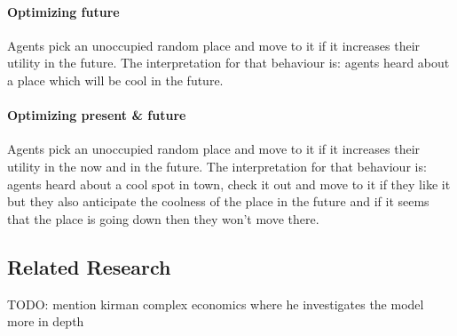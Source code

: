 \paragraph{Optimizing future} Agents pick an unoccupied random place and move to it if it increases their utility in the future. The interpretation for that behaviour is: agents heard about a place which will be cool in the future.

\paragraph{Optimizing present \& future} Agents pick an unoccupied random place and move to it if it increases their utility in the now and in the future. The interpretation for that behaviour is: agents heard about a cool spot in town, check it out and move to it if they like it but they also anticipate the coolness of the place in the future and if it seems that the place is going down then they won't move there.

\subsection{Related Research}
TODO: mention kirman complex economics where he investigates the model more in depth
